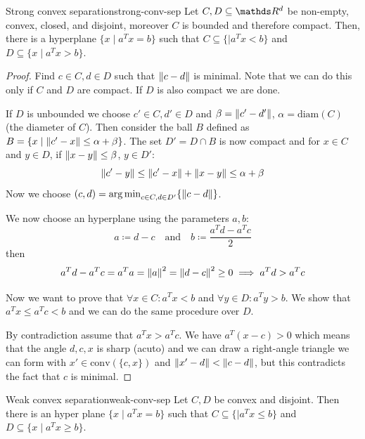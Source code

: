 \documentclass[12pt]{extarticle}
\begin{document}
\begin{theorem}{Strong convex separation}{strong-conv-sep}
	Let $C, D \subseteq \R^d$ be non-empty, convex, closed, and disjoint,
	moreover $C$ is bounded and therefore compact.
	Then, there is a hyperplane $\{x \mid a^T x = b\}$ such that
	$C \subseteq \{ \mid a^T x < b\}$ and $D \subseteq \{ x \mid a^T x > b\}$.
\end{theorem}

\begin{proof}
	Find $c \in C, d \in D$ such that $\norm{c-d}$ is minimal.
	Note that we can do this only if $C$ and $D$ are compact.
	If $D$ is also compact we are done.

	If $D$ is unbounded we choose $c'\in C, d' \in D$ and $\beta = \norm{c' - d'}$,
	$\alpha = \mathrm{diam}(C)$ (the diameter of $C$).
	Then consider the ball $B$ defined as $B = \{x \mid \norm{c' - x} \leq \alpha+\beta\}$.
	The set $D'= D \cap B$ is now compact and for $x \in C$ and $y \in D$, if $\norm{x - y} \leq \beta$,
	$y \in D'$:
	\begin{equation}
		\norm{c'-y} \leq \norm{c' - x} + \norm{x - y} \leq \alpha + \beta
	\end{equation}
	Now we choose $(c, d) = \operatorname*{arg\,min}_{c \in C, d \in D'} \{\norm{c - d}\}$.

	We now choose an hyperplane using the parameters $a, b$:
	\begin{equation}
		a \coloneq d - c \quad \text{and} \quad b \coloneq \frac{a^T d - a^T c}{2}
	\end{equation}
	then
	\begin{equation}
		a^Td - a^T c = a^T a = \norm{a}^2 = \norm{d - c}^2 \geq 0
		\implies a^T d > a^T c
	\end{equation}

	Now we want to prove that $\forall x \in C: a^Tx < b$ and $\forall y \in D: a^T y > b$.
	We show that $a^T x \leq a^T c < b$ and we can do the same procedure over $D$.

	By contradiction assume that $a^Tx > a^Tc$.
	We have $a^T(x-c)>0$ which means that the angle $d, c, x$ is sharp (acuto) and we can draw
	a right-angle triangle we can form with $x' \in \mathrm{conv}(\{c, x\})$ and
	$\norm{x'-d}<\norm{c-d}$, but this contradicts the fact that $c$ is minimal.
\end{proof}


\begin{theorem}{Weak convex separation}{weak-conv-sep}
	Let $C, D$ be convex and disjoint.
	Then there is an hyper plane $\{x \mid a^T x= b\}$ such that
	$C \subseteq \{ \mid a^T x \leq b\}$ and $D \subseteq \{ x \mid a^T x \geq b\}$.
\end{theorem}
\end{document}
